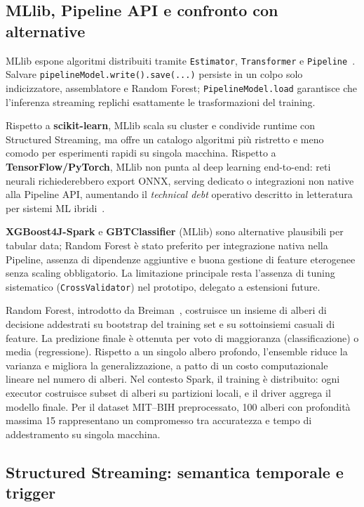 \subsection{MLlib, Pipeline API e confronto con alternative}\label{subsec:mllib-alternative}

MLlib espone algoritmi distribuiti tramite \texttt{Estimator}, \texttt{Transformer} e \texttt{Pipeline}~\cite{meng2016mllib}.
Salvare \texttt{pipelineModel.write().save(...)} persiste in un colpo solo indicizzatore, assemblatore e Random Forest; \texttt{PipelineModel.load} garantisce che l'inferenza streaming replichi esattamente le trasformazioni del training.

Rispetto a \textbf{scikit-learn}, MLlib scala su cluster e condivide runtime con Structured Streaming, ma offre un catalogo algoritmi più ristretto e meno comodo per esperimenti rapidi su singola macchina.
Rispetto a \textbf{TensorFlow/PyTorch}, MLlib non punta al deep learning end-to-end: reti neurali richiederebbero export ONNX, serving dedicato o integrazioni non native alla Pipeline API, aumentando il \emph{technical debt} operativo descritto in letteratura per sistemi ML ibridi~\cite{sculley2015hidden}.

\textbf{XGBoost4J-Spark} e \textbf{GBTClassifier} (MLlib) sono alternative plausibili per tabular data; Random Forest è stato preferito per integrazione nativa nella Pipeline, assenza di dipendenze aggiuntive e buona gestione di feature eterogenee senza scaling obbligatorio.
La limitazione principale resta l'assenza di tuning sistematico (\texttt{CrossValidator}) nel prototipo, delegato a estensioni future.

Random Forest, introdotto da Breiman~\cite{breiman2001random}, costruisce un insieme di alberi di decisione addestrati su bootstrap del training set e su sottoinsiemi casuali di feature.
La predizione finale è ottenuta per voto di maggioranza (classificazione) o media (regressione).
Rispetto a un singolo albero profondo, l'ensemble riduce la varianza e migliora la generalizzazione, a patto di un costo computazionale lineare nel numero di alberi.
Nel contesto Spark, il training è distribuito: ogni executor costruisce subset di alberi su partizioni locali, e il driver aggrega il modello finale.
Per il dataset MIT--BIH preprocessato, 100 alberi con profondità massima 15 rappresentano un compromesso tra accuratezza e tempo di addestramento su singola macchina.

\subsection{Structured Streaming: semantica temporale e trigger}\label{subsec:structured-streaming}

